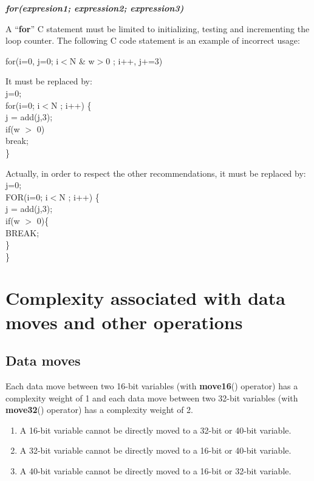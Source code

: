 \textbf{\emph{for(expresion1; expression2; expression3)}}

A ``\textbf{for}'' C statement must be limited to initializing,
testing and incrementing the loop counter. The following C code
statement is an example of incorrect usage:

for(i=0, j=0; i$<$N \& w$>$0 ; i++, j+=3)

It must be replaced by: \\
j=0;\\
for(i=0; i$<$N ; i++) \{\\
j = add(j,3);\\
if(w $>$ 0)\\
break; \\
\}

Actually, in order to respect the other recommendations, it must
be replaced by: \\
j=0;\\
FOR(i=0; i$<$N ; i++) \{\\
j = add(j,3);\\
if(w $>$ 0)\{\\
BREAK; \\
\}\\
\}


\section{Complexity associated with data moves and other operations}

\subsection{Data moves}

Each data move between two 16-bit variables (with
\textbf{move16}() operator) has a complexity weight of 1 and each
data move between two 32-bit variables (with \textbf{move32}()
operator) has a complexity weight of 2.
\begin{enumerate}{}{}
    \item A 16-bit variable cannot be directly moved to a 32-bit or 40-bit variable.
    \item A 32-bit variable cannot be directly moved to a 16-bit or 40-bit variable.
    \item A 40-bit variable cannot be directly moved to a 16-bit or 32-bit variable.
\end{enumerate}

